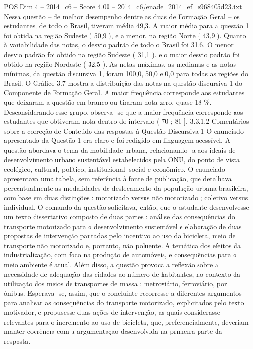 \begin{textsample}{POS Dim 4 – 2014\_c6 – Score 4.00 – 2014\_c6/enade\_2014\_ef\_e968405d23.txt}
Nessa questão – de melhor desempenho dentre as duas de Formação Geral – os estudantes, de todo o Brasil, tiveram média 49,3.
A maior média para a questão 1 foi obtida na região Sudeste ( 50,9 ), e a menor, na região Norte ( 43,9 ).
Quanto à variabilidade das notas, o desvio padrão de todo o Brasil foi 31,6.
O menor desvio padrão foi obtido na região Sudeste ( 31,1 ), e o maior desvio padrão foi obtido na região Nordeste ( 32,5 ).
As notas máximas, as medianas e as notas mínimas, da questão discursiva 1, foram 100,0, 50,0 e 0,0 para todas as regiões do Brasil.
O Gráfico 3.7 mostra a distribuição das notas na questão discursiva 1 do Componente de Formação Geral.
A maior frequência corresponde aos estudantes que deixaram a questão em branco ou tiraram nota zero, quase 18 \%.
Desconsiderando esse grupo, observa -se que a maior frequência corresponde aos estudantes que obtiveram nota dentro do intervalo ( 70 ; 80 ]. 3.3.1.2 Comentários sobre a correção de Conteúdo das respostas à Questão Discursiva 1 O enunciado apresentado da Questão 1 era claro e foi redigido em linguagem acessível.
A questão abordava o tema da mobilidade urbana, relacionando -a aos ideais de desenvolvimento urbano sustentável estabelecidos pela ONU, do ponto de vista ecológico, cultural, político, institucional, social e econômico.
O enunciado apresentava uma tabela, sem referência à fonte de publicação, que detalhava percentualmente as modalidades de deslocamento da população urbana brasileira, com base em duas distinções : motorizado versus não motorizado ; coletivo versus individual.
O comando da questão solicitava, então, que o estudante desenvolvesse um texto dissertativo composto de duas partes : análise das consequências do transporte motorizado para o desenvolvimento sustentável e elaboração de duas propostas de intervenção pautadas pelo incentivo ao uso da bicicleta, meio de transporte não motorizado e, portanto, não poluente.
A temática dos efeitos da industrialização, com foco na produção de automóveis, e consequências para o meio ambiente é atual.
Além disso, a questão provoca a reflexão sobre a necessidade de adequação das cidades ao número de habitantes, no contexto da utilização dos meios de transportes de massa : metroviário, ferroviário, por ônibus.
Esperava -se, assim, que o concluinte recorresse a diferentes argumentos para analisar as consequências do transporte motorizado, explicitados pelo texto motivador, e propusesse duas ações de intervenção, as quais considerasse relevantes para o incremento ao uso de bicicleta, que, preferencialmente, deveriam manter coerência com a argumentação desenvolvida na primeira parte da resposta.

\end{textsample}
